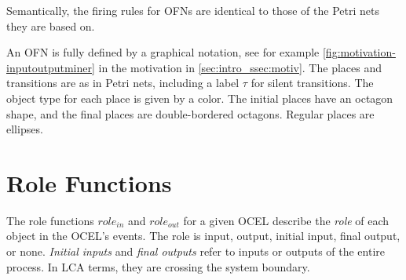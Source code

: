Semantically, the firing rules for OFNs are identical to those of the Petri nets they are based on.



    An OFN is fully defined by a graphical notation, see for example \autoref{fig:motivation-inputoutputminer} in the motivation in \cref{sec:intro_ssec:motiv}.
    The places and transitions are as in Petri nets, including a label $\tau$ for silent transitions.
    The object type for each place is given by a color.
    The initial places have an octagon shape, and the final places are double-bordered octagons.
    Regular places are ellipses.
    


\section{Role Functions}



The role functions $role_{in}$ and $role_{out}$ for a given OCEL describe the \emph{role} of each object in the OCEL's events.
The role is input, output, initial input, final output, or none.
\emph{Initial inputs} and \emph{final outputs} refer to inputs or outputs of the entire process.
In LCA terms, they are crossing the system boundary.



